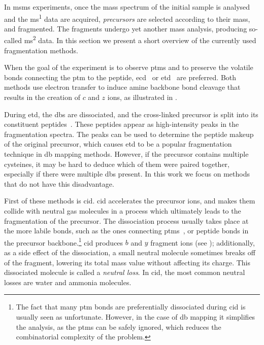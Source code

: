 In \gls*{msms} experiments, once the mass spectrum of the initial sample is analysed and the \gls*{ms}\textsuperscript{1} data are acquired, \emph{precursors} are selected according to their mass, and fragmented. The fragments undergo yet another mass analysis, producing so-called \gls*{ms}\textsuperscript{2} data. In this section we present a short overview of the currently used fragmentation methods.

When the goal of the experiment is to observe \glspl*{ptm} and to preserve the volatile bonds connecting the \gls*{ptm} to the peptide, \gls*{ecd}~\cite{zubarev2000electron} or \gls*{etd}~\cite{syka2004peptide} are preferred. Both methods use electron transfer to induce amine backbone bond cleavage that results in the creation of \(c\) and \(z\) ions, as illustrated in .

During \gls*{etd}, the \glspl*{db} are dissociated, and the cross-linked precursor is split into its constituent peptides~\cite{liu2014facilitating}. These peptides appear as high-intensity peaks in the fragmentation spectra. The peaks can be used to determine the peptide makeup of the original precursor, which causes \gls*{etd} to be a popular fragmentation technique in \gls*{db} mapping methods. However, if the precursor contains multiple cysteines, it may be hard to deduce which of them were paired together, especially if there were multiple \glspl*{db} present. In this work we focus on methods that do not have this disadvantage.

First of these methods is \gls*{cid}. \gls*{cid} accelerates the precursor ions, and makes them collide with neutral gas molecules in a process which ultimately leads to the fragmentation of the precursor. The dissociation process usually takes place at the more labile bonds, such as the ones connecting \glspl*{ptm}~\cite{quan2013cid}, or peptide bonds in the precursor backbone.\footnote{The fact that many \gls*{ptm} bonds are preferentially dissociated during \gls*{cid} is usually seen as unfortunate. However, in the case of \gls*{db} mapping it simplifies the analysis, as the \glspl*{ptm} can be safely ignored, which reduces the combinatorial complexity of the problem.} \gls*{cid} produces \(b\) and \(y\) fragment ions (see ); additionally, as a side effect of the dissociation, a small neutral molecule sometimes breaks off of the fragment, lowering its total mass value without affecting its charge. This dissociated molecule is called a \emph{neutral loss}. In \gls*{cid}, the most common neutral losses are water and ammonia molecules.


